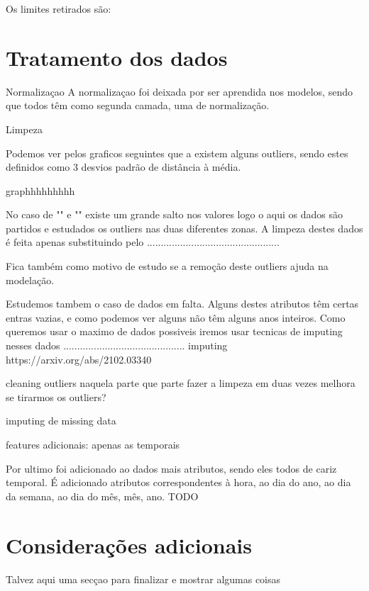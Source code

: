 Os limites retirados são:




\section{Tratamento dos dados  \label{se:data_treatment}}

Normalizaçao
A normalizaçao foi deixada por ser aprendida nos modelos, sendo que todos têm como segunda camada, uma de normalização.

Limpeza

Podemos ver pelos graficos seguintes que a existem alguns outliers, sendo estes definidos como 3 desvios padrão de distância à média.

graphhhhhhhhh


No caso de "" e "" existe um grande salto nos valores logo o aqui os dados são partidos e estudados os outliers nas duas diferentes zonas.
A limpeza destes dados é feita apenas substituindo pelo ................................................

Fica também como motivo de estudo se a remoção deste outliers ajuda na modelação.


Estudemos tambem o caso de dados em falta. Alguns destes atributos têm certas entras vazias, e como podemos ver alguns não têm alguns anos inteiros.
Como queremos usar o maximo de dados possiveis iremos usar tecnicas de imputing nesses dados 
............................................
imputing
https://arxiv.org/abs/2102.03340

cleaning
	outliers
		naquela parte que parte fazer a limpeza em duas vezes
		melhora se tirarmos os outliers?
		
	imputing de missing data
	
features adicionais:
	apenas as temporais	

Por ultimo foi adicionado ao dados mais atributos, sendo eles todos de cariz temporal. É adicionado atributos correspondentes à hora, ao dia do ano, ao dia da semana, ao dia do mês, mês, ano. TODO


\section{Considerações adicionais  \label{se:dados_plus}}

Talvez aqui uma secçao para finalizar e mostrar algumas coisas
